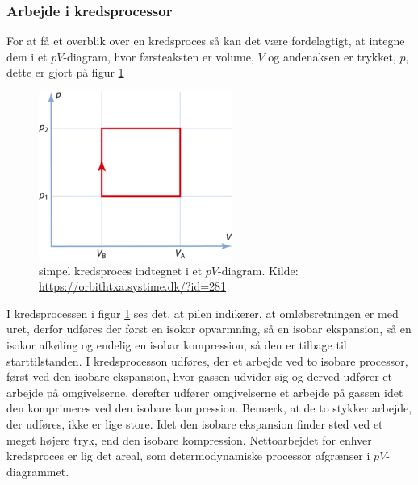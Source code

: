 \documentclass[SRC.tex]{subfiles}
\begin{document}
	\subsubsection{Arbejde i kredsprocessor}
	For at få et overblik over en kredsproces så kan det være fordelagtigt, at 
	integne dem i et \(pV\)-diagram, hvor førsteaksten er volume, \(V\) og 
	andenaksen er trykket, \(p\), dette er gjort på figur \ref{fig:csm044pvdiagram235px7d08cd8d72}
	\begin{figure}[h!]
		\centering
		\includegraphics[scale=0.5]{Billeder/csm_044_PV_diagram_235px_7d08cd8d72}
		\caption{simpel kredsproces indtegnet i et \(pV\)-diagram. Kilde: \url{https://orbithtxa.systime.dk/?id=281}}
		\label{fig:csm044pvdiagram235px7d08cd8d72}
	\end{figure}
	
	I kredsprocessen i figur \ref{fig:csm044pvdiagram235px7d08cd8d72} ses det, at pilen indikerer, at omløbsretningen er med uret, derfor udføres der
	først en isokor opvarmning, så en isobar ekspansion, så en isokor afkøling og
	endelig en isobar kompression, så den er tilbage til starttilstanden. I 
	kredsprocesson udføres, der et arbejde ved to isobare processor, først ved
	den isobare ekspansion, hvor gassen udvider sig og derved udfører et arbejde
	på omgivelserne, derefter udfører omgivelserne et arbejde på gassen idet den 
	komprimeres ved den isobare kompression. Bemærk, at de to stykker arbejde, der
	udføres, ikke er lige store. Idet den isobare ekspansion finder sted ved et meget
	højere tryk, end den isobare kompression. Nettoarbejdet for enhver kredsproces er
	lig det areal, som determodynamiske processor afgrænser i \(pV\)-diagrammet. 
	
\end{document}
